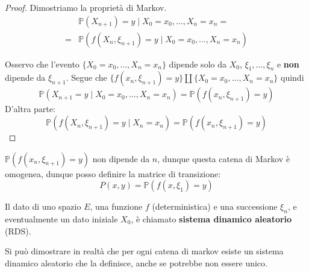 \begin{proof}{}
    Dimostriamo la proprietà di Markov.
    \begin{align*}
        &\mathbb{P}{(X_{n+1}) = y \;|\; X_{0} = x_{0}, \dots, X_{n} = x_{n}} =
        \\
        = &\mathbb{P}{(f{(X_{n}, \xi_{n+1} )} = y \;|\; X_{0} = x_{0}, \dots,
        X_{n} = x_{n})}
    \end{align*} 

    Osservo che l'evento \(\{X_{0} = x_{0}, \dots, X_{n} = x_{n}\} \) dipende
    solo da \(X_{0}\), \(\xi_{1}, \dots, \xi_n\) e \textbf{non} dipende da
    \(\xi_{n+1} \). Segue che \(\{f{(x_{n}, \xi_{n+1} )} = y\} \coprod \{X_{0} =
    x_{0}, \dots, X_n = x_{n}\} \) quindi 
    \[
      \mathbb{P}{(X_{n+1}  = y \;|\; X_{0} = x_{0}, \dots, X_{n} = x_{n})} =
      \mathbb{P}{(f{(x_{n}, \xi_{n+1} )} = y)}
    \]
    D'altra parte:
    \[
      \mathbb{P}{(f{(X_{n}, \xi_{n+1} )} = y \;|\; X_{n} = x_{n})} =
      \mathbb{P}{(f{(x_{n}, \xi_{n+1} )} = y)}
    \]
\end{proof}
\begin{remark}{}
    \(\mathbb{P}{(f{(x_{n}, \xi_{n+1} )} = y)}\) non dipende da \(n\), dunque
    questa catena di Markov è omogenea, dunque posso definire la matrice di
    transizione:
    \[
      P{(x, y)} = \mathbb{P}{(f{(x, \xi_{1})} = y)}
    \]
\end{remark}
\begin{remark}{}
    Il dato di uno spazio \(E\), una funzione \(f\) (deterministica) e una
    successione \(\xi_n\), e eventualmente un dato iniziale \(X_{0}\),
    è chiamato \textbf{sistema dinamico aleatorio} (RDS).
\end{remark}

Si può dimostrare in realtà che per ogni catena di markov esiste un sistema
dinamico aleatorio che la definisce, anche se potrebbe non essere unico.





